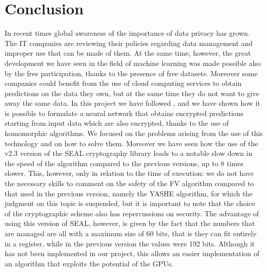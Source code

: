 \section{Conclusion}

In recent times global awareness of the importance of data privacy has grown. The IT companies are reviewing their policies regarding data management and improper use that can be made of them. At the same time, however, the great development we have seen in the field of machine learning was made possible also by the free participation, thanks to the presence of free datasets. Moreover some companies could benefit from the use of cloud computing services to obtain predictions on the data they own, but at the same time they do not want to give away the same data. In this project we have followed \cite{dowlin2016cryptonets}, and we have shown how it is possible to formulate a neural network that obtains encrypted predictions starting from input data which are also encrypted, thanks to the use of homomorphic algorithms. We focused on the problems arising from the use of this technology and on how to solve them. Moreover we have seen how the use of the v2.3 version of the SEAL cryptography library leads to a notable slow down in the speed of the algorithm compared to the previous versions, up to 8 times slower. This, however, only in relation to the time of execution: we do not have the necessary skills to comment on the safety of the FV algorithm compared to that used in the previous version, namely the YASHE algorithm, for which the judgment on this topic is suspended, but it is important to note that the choice of the cryptographic scheme also has repercussions on security. The advantage of using this version of SEAL, however, is given by the fact that the numbers that are managed are all with a maximum size of 60 bits, that is they can fit entirely in a register, while in the previous version the values were 192 bits. Although it has not been implemented in our project, this allows an easier implementation of an algorithm that exploits the potential of the GPUs.